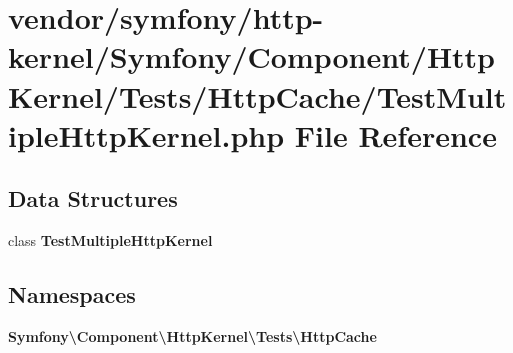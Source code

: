 \section{vendor/symfony/http-\/kernel/\+Symfony/\+Component/\+Http\+Kernel/\+Tests/\+Http\+Cache/\+Test\+Multiple\+Http\+Kernel.php File Reference}
\label{_test_multiple_http_kernel_8php}
\subsection*{Data Structures}
\begin{DoxyCompactItemize}
\item 
class {\bf Test\+Multiple\+Http\+Kernel}
\end{DoxyCompactItemize}
\subsection*{Namespaces}
\begin{DoxyCompactItemize}
\item 
 {\bf Symfony\textbackslash{}\+Component\textbackslash{}\+Http\+Kernel\textbackslash{}\+Tests\textbackslash{}\+Http\+Cache}
\end{DoxyCompactItemize}
